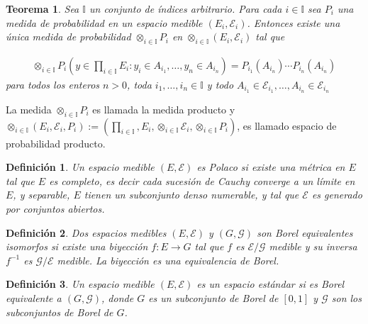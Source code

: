 \documentclass{article}
\newtheorem{Def}{Definición}[section]
\newtheorem{Teo}{Teorema}[section]
\numberwithin{equation}{section}
\begin{document}
\begin{Teo}
Sea $\mathbb{I}$ un conjunto de \'indices arbitrario. Para cada $i\in\mathbb{I}$ sea $P_{i}$ una medida de probabilidad en un espacio medible $\left(E_{i},\mathcal{E}_{i}\right)$. Entonces existe una \'unica medida de probabilidad $\otimes_{i\in\mathbb{I}}P_{i}$ en $\otimes_{i\in\mathbb{I}}\left(E_{i},\mathcal{E}_{i}\right)$ tal que 

\begin{eqnarray}
\otimes_{i\in\mathbb{I}}P_{i}\left(y\in\prod_{i\in\mathbb{I}}E_{i}:y_{i}\in A_{i_{1}},\ldots,y_{n}\in A_{i_{n}}\right)=P_{i_{1}}\left(A_{i_{n}}\right)\cdots P_{i_{n}}\left(A_{i_{n}}\right)
\end{eqnarray}
para todos los enteros $n>0$, toda $i_{1},\ldots,i_{n}\in\mathbb{I}$ y todo $A_{i_{1}}\in\mathcal{E}_{i_{1}},\ldots,A_{i_{n}}\in\mathcal{E}_{i_{n}}$
\end{Teo}

La medida $\otimes_{i\in\mathbb{I}}P_{i}$ es llamada la medida producto y $\otimes_{i\in\mathbb{I}}\left(E_{i},\mathcal{E}_{i},P_{i}\right):=\left(\prod_{i\in\mathbb{I}},E_{i},\otimes_{i\in\mathbb{I}}\mathcal{E}_{i},\otimes_{i\in\mathbb{I}}P_{i}\right)$, es llamado espacio de probabilidad producto.


\begin{Def}
Un espacio medible $\left(E,\mathcal{E}\right)$ es \textit{Polaco} si existe una m\'etrica en $E$ tal que $E$ es completo, es decir cada sucesi\'on de Cauchy converge a un l\'imite en $E$, y \textit{separable}, $E$ tienen un subconjunto denso numerable, y tal que $\mathcal{E}$ es generado por conjuntos abiertos.
\end{Def}


\begin{Def}
Dos espacios medibles $\left(E,\mathcal{E}\right)$ y $\left(G,\mathcal{G}\right)$ son Borel equivalentes \textit{isomorfos} si existe una biyecci\'on $f:E\rightarrow G$ tal que $f$ es $\mathcal{E}/\mathcal{G}$ medible y su inversa $f^{-1}$ es $\mathcal{G}/\mathcal{E}$ medible. La biyecci\'on es una equivalencia de Borel.
\end{Def}

\begin{Def}
Un espacio medible  $\left(E,\mathcal{E}\right)$ es un \textit{espacio est\'andar} si es Borel equivalente a $\left(G,\mathcal{G}\right)$, donde $G$ es un subconjunto de Borel de $\left[0,1\right]$ y $\mathcal{G}$ son los subconjuntos de Borel de $G$.
\end{Def}
\end{document}
